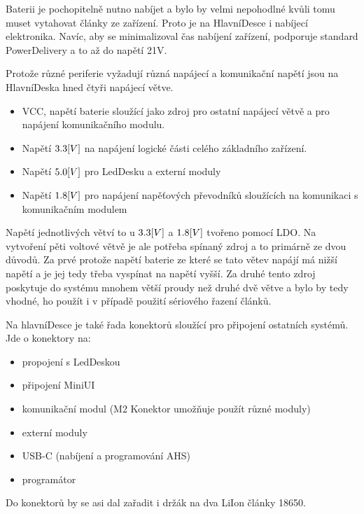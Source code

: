 Baterii je pochopitelně nutno nabíjet a bylo by velmi nepohodlné kvůli tomu muset vytahovat články ze zařízení.
Proto je na HlavníDesce i nabíjecí elektronika.
Navíc, aby se minimalizoval čas nabíjení zařízení, podporuje standard PowerDelivery a to až do napětí 21V.

Protože různé periferie vyžadují různá napájecí a komunikační napětí jsou na HlavníDeska hned čtyři napájecí větve.
\begin{itemize}
    \item VCC, napětí baterie sloužící jako zdroj pro ostatní napájecí větvě a pro napájení komunikačního modulu. 
    \item Napětí \(3.3\-[V]\) na napájení logické části celého základního zařízení.
    \item Napětí \(5.0\-[V]\) pro LedDesku a externí moduly
    \item Napětí \(1.8\-[V]\) pro napájení napěťových převodníků sloužících na komunikaci s komunikačním modulem 
\end{itemize}
Napětí jednotlivých větví to u \(3.3\-[V]\) a \(1.8\-[V]\) tvořeno pomocí LDO.
Na vytvoření pěti voltové větvě je ale potřeba spínaný zdroj a to primárně ze dvou důvodů.
Za prvé protože napětí baterie ze které se tato větev napájí má nižší napětí a je jej tedy třeba vyspínat na napětí vyšší.
Za druhé tento zdroj poskytuje do systému mnohem větší proudy než druhé dvě větve a bylo by tedy vhodné, ho použít i v případě použití sériového řazení článků.

Na hlavníDesce je také řada konektorů sloužící pro připojení ostatních systémů.
Jde o konektory na:
\begin{itemize}
    \item propojení s LedDeskou                                             %
    \item připojení MiniUI                                                  %
    \item komunikační modul (M2 Konektor umožňuje použít různé moduly)      %
    \item externí moduly                                                    %
    \item USB-C (nabíjení a programování AHS)                               %
    \item programátor                                                       %
\end{itemize}
Do konektorů by se asi dal zařadit i držák na dva LiIon články 18650.

